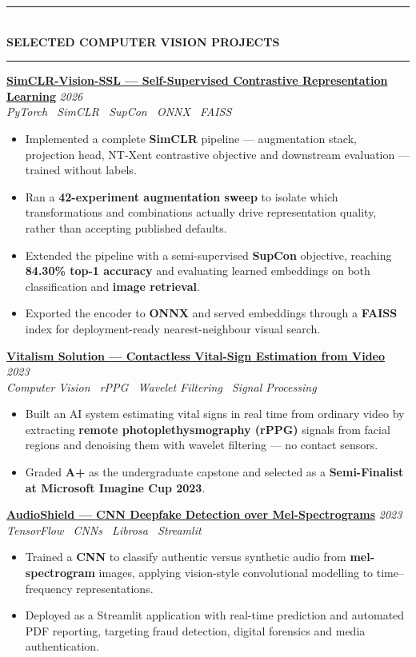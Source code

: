 \documentclass[10pt, a4paper]{article}
\newcommand{\cvsection}[1]{%
  \vspace{3pt}%
  {\color{navy}\rule{\linewidth}{1.1pt}}\\[0.5pt]%
  {\color{navy}\bfseries\fontsize{9.5}{11}\selectfont\uppercase{#1}}\\[-4pt]%
  {\color{teal}\rule{\linewidth}{0.6pt}}%
  \vspace{2pt}%
}
\newcommand{\cvproject}[3]{%
  \vspace{2.5pt}%
  {\bfseries\color{navy}#1} \hfill {\color{midgray}\textit{#3}}\\[-1.5pt]%
  {\color{teal}\textit{#2}}%
}
\newenvironment{cvitems}{%
  \begin{itemize}[leftmargin=11pt, itemsep=0.5pt, parsep=0pt, topsep=1pt,
                  label={\textcolor{teal}{$\bullet$}}]
}{%
  \end{itemize}%
}
\begin{document}
\cvsection{Selected Computer Vision Projects}

\cvproject{\href{https://github.com/MahmoudAlyosify/SimCLR-Vision-SSL}{SimCLR-Vision-SSL --- Self-Supervised Contrastive Representation Learning}}
          {PyTorch \textperiodcentered\ SimCLR \textperiodcentered\ SupCon \textperiodcentered\ ONNX \textperiodcentered\ FAISS}
          {2026}
\begin{cvitems}
  \item Implemented a complete \textbf{SimCLR} pipeline --- augmentation stack, projection head, NT-Xent contrastive objective and downstream evaluation --- trained without labels.
  \item Ran a \textbf{42-experiment augmentation sweep} to isolate which transformations and combinations actually drive representation quality, rather than accepting published defaults.
  \item Extended the pipeline with a semi-supervised \textbf{SupCon} objective, reaching \textbf{84.30\% top-1 accuracy} and evaluating learned embeddings on both classification and \textbf{image retrieval}.
  \item Exported the encoder to \textbf{ONNX} and served embeddings through a \textbf{FAISS} index for deployment-ready nearest-neighbour visual search.
\end{cvitems}

\cvproject{\href{https://vitalismsolution.github.io/}{Vitalism Solution --- Contactless Vital-Sign Estimation from Video}}
          {Computer Vision \textperiodcentered\ rPPG \textperiodcentered\ Wavelet Filtering \textperiodcentered\ Signal Processing}
          {2023}
\begin{cvitems}
  \item Built an AI system estimating vital signs in real time from ordinary video by extracting \textbf{remote photoplethysmography (rPPG)} signals from facial regions and denoising them with wavelet filtering --- no contact sensors.
  \item Graded \textbf{A+} as the undergraduate capstone and selected as a \textbf{Semi-Finalist at Microsoft Imagine Cup 2023}.
\end{cvitems}

\cvproject{\href{https://github.com/MahmoudAlyosify/AudioShield}{AudioShield --- CNN Deepfake Detection over Mel-Spectrograms}}
          {TensorFlow \textperiodcentered\ CNNs \textperiodcentered\ Librosa \textperiodcentered\ Streamlit}
          {2023}
\begin{cvitems}
  \item Trained a \textbf{CNN} to classify authentic versus synthetic audio from \textbf{mel-spectrogram} images, applying vision-style convolutional modelling to time--frequency representations.
  \item Deployed as a Streamlit application with real-time prediction and automated PDF reporting, targeting fraud detection, digital forensics and media authentication.
\end{cvitems}
\end{document}
